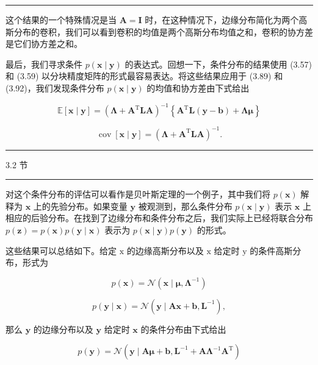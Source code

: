 \documentclass[10pt]{article}
\newcommand{\HRule}{\begin{center}\rule{0.9\linewidth}{0.2mm}\end{center}}
\begin{document}
\HRule

这个结果的一个特殊情况是当 \(\mathbf{A} = \mathbf{I}\) 时，在这种情况下，边缘分布简化为两个高斯分布的卷积，我们可以看到卷积的均值是两个高斯分布均值之和，卷积的协方差是它们协方差之和。

最后，我们寻求条件 \(p\left( {\mathbf{x} \mid  \mathbf{y}}\right)\) 的表达式。回想一下，条件分布的结果使用 (3.57) 和 (3.59) 以分块精度矩阵的形式最容易表达。将这些结果应用于 (3.89) 和 (3.92)，我们发现条件分布 \(p\left( {\mathbf{x} \mid  \mathbf{y}}\right)\) 的均值和协方差由下式给出

\[
\mathbb{E}\left\lbrack  {\mathbf{x} \mid  \mathbf{y}}\right\rbrack   = {\left( \mathbf{\Lambda } + {\mathbf{A}}^{\mathrm{T}}\mathbf{{LA}}\right) }^{-1}\left\{  {{\mathbf{A}}^{\mathrm{T}}\mathbf{L}\left( {\mathbf{y} - \mathbf{b}}\right)  + \mathbf{\Lambda }\mathbf{\mu }}\right\}   \tag{3.95}
\]

\[
\operatorname{cov}\left\lbrack  {\mathbf{x} \mid  \mathbf{y}}\right\rbrack   = {\left( \mathbf{\Lambda } + {\mathbf{A}}^{\mathrm{T}}\mathbf{L}\mathbf{A}\right) }^{-1}. \tag{3.96}
\]

\HRule

3.2 节

\HRule

对这个条件分布的评估可以看作是贝叶斯定理的一个例子，其中我们将 \(p\left( \mathbf{x}\right)\) 解释为 \(\mathbf{x}\) 上的先验分布。如果变量 \(\mathbf{y}\) 被观测到，那么条件分布 \(p\left( {\mathbf{x} \mid  \mathbf{y}}\right)\) 表示 \(\mathbf{x}\) 上相应的后验分布。在找到了边缘分布和条件分布之后，我们实际上已经将联合分布 \(p\left( \mathbf{z}\right)  = p\left( \mathbf{x}\right) p\left( {\mathbf{y} \mid  \mathbf{x}}\right)\) 表示为 \(p\left( {\mathbf{x} \mid  \mathbf{y}}\right) p\left( \mathbf{y}\right)\) 的形式。

这些结果可以总结如下。给定 \(\mathrm{x}\) 的边缘高斯分布以及 \(\mathrm{x}\) 给定时 \(\mathrm{y}\) 的条件高斯分布，形式为

\[
p\left( \mathbf{x}\right)  = \mathcal{N}\left( {\mathbf{x} \mid  \mathbf{\mu },{\mathbf{\Lambda }}^{-1}}\right)  \tag{3.97}
\]

\[
p\left( {\mathbf{y} \mid  \mathbf{x}}\right)  = \mathcal{N}\left( {\mathbf{y} \mid  \mathbf{A}\mathbf{x} + \mathbf{b},{\mathbf{L}}^{-1}}\right) , \tag{3.98}
\]

那么 \(\mathbf{y}\) 的边缘分布以及 \(\mathbf{y}\) 给定时 \(\mathbf{x}\) 的条件分布由下式给出

\[
p\left( \mathbf{y}\right)  = \mathcal{N}\left( {\mathbf{y} \mid  \mathbf{{A\mu }} + \mathbf{b},{\mathbf{L}}^{-1} + {\mathbf{{A\Lambda }}}^{-1}{\mathbf{A}}^{\mathrm{T}}}\right)  \tag{3.99}
\]
\end{document}
